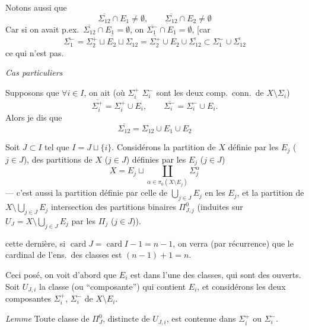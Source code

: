 \documentclass[11pt,a4paper]{article}
\begin{document}
Notons aussi que
\[
\overline{\Sigma_{12}}\cap E_1\neq\emptyset, \qquad
\overline{\Sigma_{12}}\cap E_2\neq\emptyset
\]
Car si on avait p.ex.\ $\overline{\Sigma_{12}}\cap E_1=\emptyset$, on
 
$\overline{\Sigma_1^-}\cap E_1=\emptyset$, [car
\[
\overline{\Sigma_1^-} = \overline{\Sigma_2^+\sqcup E_2\sqcup\Sigma_{12}} =
\overline{\Sigma_2^+}\cup E_2\cup\overline{\Sigma_{12}} \subset
\Sigma_1^-\cup\overline{\Sigma_{12}}
\]
ce qui n'est pas.

\emph{Cas particuliers}

Supposons que $\forall i\in I$,  on ait (où
$\Sigma_i^+$ $\Sigma_i^-$ sont les deux comp.\ conn.\ de
$X\setminus\Sigma_i$) 
\[
\overline{\Sigma_i^+} = \Sigma_i^+\cup E_i, \qquad
\overline{\Sigma_i^-} = \Sigma_i^-\cup E_i .
\]
Alors je dis que
\[
\overline{\Sigma_{12}} = \Sigma_{12}\cup E_1\cup E_2
\]

 Soit $J\subset I$ tel que $I=J\sqcup\{i\}$. Considérons
la partition  de $X$  définie par les $E_j$
($j\in J$),   des partitions
 de $X$ ($j\in J$) définies par les $E_j$ \ill{}
($j\in J$)
\[
X = E_j \sqcup \coprod_{\alpha\in\pi_0(X\setminus E_j)} \Sigma_j^{\alpha}
\]
— c'est aussi la partition définie par celle de $\bigcup_{j\in J}E_j$ en les
$E_j$, et la partition  de $X\setminus\bigcup_{j\in J}E_j$
intersection des partitions binaires $\Pi_{J,j}^0$ 
(induites sur $U_J = X\setminus\bigcup_{j\in J}E_j$ par les $\Pi_j$
($j\in J$)). 

cette dernière, si $\operatorname{card}J = \operatorname{card}I - 1 = n-1$,
on verra (par récurrence) que le cardinal de l'ens.\ des classes est
$(n-1)+1=n$.

Ceci posé, on voit d'abord que $E_i$ est dans l'une  des
classes, qui sont des ouverts. Soit $U_{J,i}$ la classe (ou “composante”)
qui contient $E_i$, et considérons les deux composantes $\Sigma_i^+$,
$\Sigma_i^-$ de $X\setminus E_i$.

\emph{Lemme} Toute classe de $\Pi_J^0$, distincte de $U_{J,i}$, est
contenue dans $\Sigma_i^+$ ou $\Sigma_i^-$.
\end{document}
